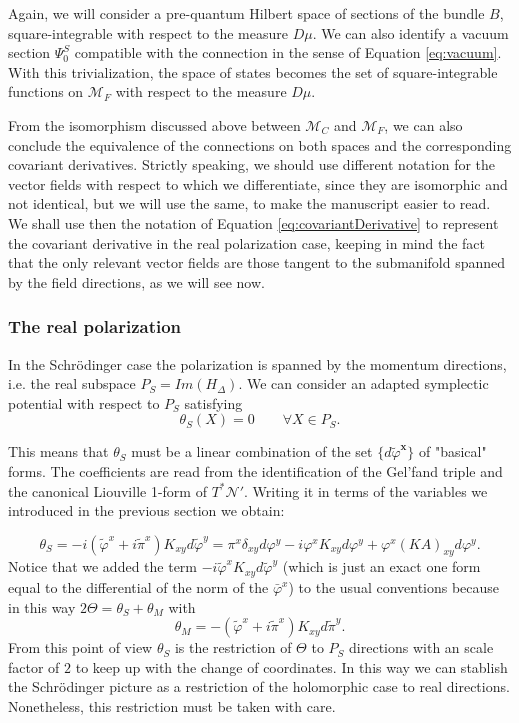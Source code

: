 \documentclass[12pt]{article}%
\begin{document}
Again, we will consider a pre-quantum Hilbert space of sections of the bundle $B$, square-integrable with respect to the measure $D\mu$. We can also identify a vacuum section $\Psi_0^S$ compatible with the connection in the sense of Equation \eqref{eq:vacuum}. With this trivialization, the space of states becomes the set of square-integrable functions on $\mathcal{M}_F$ with respect to the measure $D\mu$. 

From the isomorphism discussed above between $\mathcal{M}_C$ and $\mathcal{M}_F$, we can also conclude the equivalence of the connections on both spaces and the corresponding covariant derivatives. Strictly speaking, we should use different notation for the vector fields with respect to which we differentiate, since they are isomorphic and not identical, but we will use the same, to make the manuscript easier to read.  We shall use then the notation of Equation \eqref{eq:covariantDerivative} to represent the covariant derivative in the real polarization case, keeping in mind the fact that the only relevant vector fields are those tangent to the submanifold spanned by the field directions, as we will see now.


\subsubsection{The real polarization}
In the Schrödinger case the polarization is spanned by the momentum directions, i.e. the real subspace $P_{S}=Im(H_\Delta)$. We can consider an adapted symplectic potential with respect to $P_S$ satisfying
\begin{equation}
\label{eq:symlectic_potential_S}
\theta_S(X)=0 \qquad \forall X\in P_S.
\end{equation}

This means that $\theta_S$ must be a linear combination of the set $\{ d\tilde \varphi^\mathbf{x} \}$ of "basical" forms. The coefficients are read from the identification of the Gel'fand triple and the canonical Liouville 1-form of $T^*\mathcal{N}'$. Writing it in terms of the variables we introduced in the previous section we obtain: 

\begin{equation}
\label{eq:symplecticAdaptedSch}
\theta_S=-{i}(\tilde\varphi^x+i\tilde\pi^x)K_{xy}d\tilde\varphi^y=\pi^x\delta_{xy}d\varphi^y-i\varphi^xK_{xy} d\varphi^y+\varphi^x(K A)_{xy}d\varphi^y.
\end{equation}
Notice that we added the term $-i\tilde\varphi^xK_{xy} d\tilde\varphi^y$ (which is just an exact one form equal to the differential of the norm of the $\bar\varphi^x$) to the usual conventions because in this way $2\Theta=\theta_S+\theta_M$ with \begin{equation}
\label{eq:symplecticmomentumnaive}
\theta_M= -(\tilde\varphi^x+i\tilde\pi^x)K_{xy}{d\tilde\pi^y}.
\end{equation} From this point of view $\theta_S$ is the restriction of $\Theta$ to $P_S$ directions with an scale factor of $2$ to keep up with the change of coordinates. In this way we can stablish the Schrödinger picture as a restriction of the holomorphic case to real directions. Nonetheless, this restriction must be taken with care. 
\end{document}
